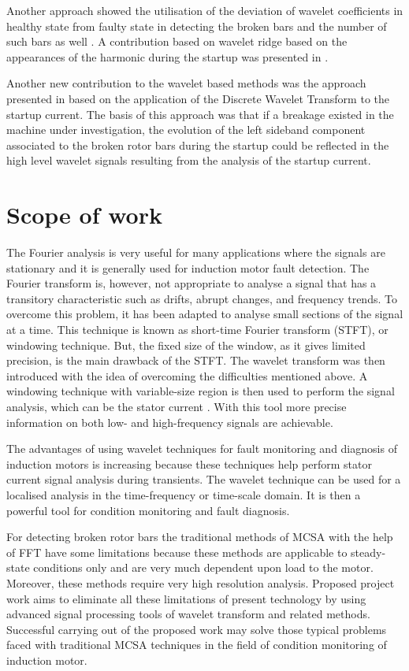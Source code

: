 \documentclass[a4paper,11pt]{report}
\begin{document}
Another approach showed the utilisation of the deviation of wavelet coefficients in healthy state from faulty state in detecting the broken bars and the number of such bars as well \cite{00976461}.
A contribution based on wavelet ridge based on the appearances of the harmonic during the startup was presented in \cite{zhang}.

Another new contribution to the wavelet based methods was the approach presented in \cite{antonino} based on the application of the Discrete Wavelet Transform to the startup current. The basis of this approach was that if a breakage existed in the machine under investigation, the evolution of the left sideband component associated to the broken rotor bars during the startup could be reflected in the high level wavelet signals resulting from the analysis of the startup current.

\section{Scope of work}
The Fourier analysis is very useful for many applications where the signals are stationary and it is generally used for induction motor fault detection. The Fourier transform is, however, not appropriate to analyse a signal that has a transitory characteristic such as drifts, abrupt changes, and frequency trends. To overcome this problem, it has been adapted to analyse small sections of the signal at a time. This technique is known as short-time Fourier transform (STFT), or windowing technique. But, the fixed size of the window, as it gives limited precision, is the main drawback of the STFT. The wavelet transform was then introduced with the idea of overcoming the difficulties mentioned above. A windowing technique with variable-size region is then used to perform the signal analysis, which can be the stator current \cite{00539845}. With this tool more precise information on both low- and high-frequency signals are achievable.

The advantages of using wavelet techniques for fault monitoring and diagnosis of induction motors is increasing because these techniques help perform stator current signal analysis during transients. The wavelet technique can be used for a localised analysis in the time-frequency or time-scale domain. It is then a powerful tool for condition monitoring and fault diagnosis.
     
For detecting broken rotor bars the traditional methods of MCSA with the help of FFT have some limitations because these methods are applicable to steady-state conditions only and are very much dependent upon load to the motor. Moreover, these methods require very high resolution analysis. Proposed project work aims to eliminate all these limitations of present technology by using advanced signal processing tools of wavelet transform and related methods. Successful carrying out of the proposed work may solve those typical problems faced with traditional MCSA techniques in the field of condition monitoring of induction motor.
\end{document}
